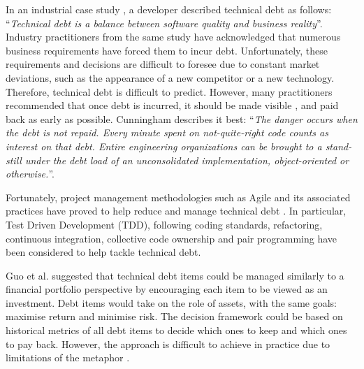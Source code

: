 \documentclass{mprop}
\begin{document}
In an industrial case study \cite{Lim2012}, a developer described technical debt
as follows: ``\textit{Technical debt is a balance between software quality and
	business reality}''. Industry practitioners from the same study have
acknowledged that numerous business requirements have forced them to incur debt.
Unfortunately, these requirements and decisions are difficult to foresee due to
constant market deviations, such as the appearance of a new competitor or a new
technology. Therefore, technical debt is difficult to predict. However, many
practitioners recommended that once debt is incurred, it should be made visible
\cite{Lim2012} \cite{Codabux2013} \cite{Morgenthaler2012}, and paid back as
early as possible. Cunningham \cite{Cunningham1993} describes it best:
``\textit{The danger occurs when the debt is not repaid. Every minute spent on
	not-quite-right code counts as interest on that debt. Entire engineering
	organizations can be brought to a stand-still under the debt load of an
	unconsolidated implementation, object-oriented or otherwise.}''.

Fortunately, project management methodologies such as Agile and its associated
practices have proved to help reduce and manage technical debt
\cite{Holvitie2014} \cite{Trumler2016}. In particular, Test Driven Development (TDD),
following coding standards, refactoring, continuous integration, collective code
ownership and pair programming have been considered to help tackle technical
debt.

Guo et al. \cite{Guo2011} suggested that technical debt items could be managed
similarly to a financial portfolio perspective by encouraging each item to be
viewed as an investment. Debt items would take on the role of assets, with the
same goals: maximise return and minimise risk. The decision framework could be
based on historical metrics of all debt items to decide which ones to keep and
which ones to pay back. However, the approach is difficult to achieve in
practice due to limitations of the metaphor \cite{Schmid2013}.
\end{document}
